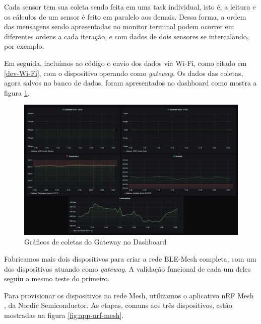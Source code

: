 \documentclass[../monografia.tex]{subfiles}
\begin{document}
Cada sensor tem sua coleta sendo feita em uma task individual, isto é, a leitura e os cálculos de um sensor é feito em paralelo aos demais. Dessa forma, a ordem das mensagens sendo apresentadas no monitor terminal podem ocorrer em diferentes ordens a cada iteração, e com dados de dois sensores se intercalando, por exemplo. \newpage

Em seguida, incluímos ao código o envio dos dados via Wi-Fi, como citado em \ref{dev-Wi-Fi}, com o dispositivo operando como \textit{gateway}. Os dados das coletas, agora salvos no banco de dados, foram apresentados no dashboard como mostra a figura \ref{fig:dashboard-graphs}.

\begin{figure}[h]
	\centering
	\includegraphics[width=\textwidth]{dashboard-graphs}
	\caption{Gráficos de coletas do Gateway no Dashboard}
	\label{fig:dashboard-graphs}
\end{figure}

Fabricamos mais dois dispositivos para criar a rede BLE-Mesh completa, com um dos dispositivos atuando como \textit{gateway}. A validação funcional de cada um deles seguiu o mesmo teste do primeiro.  

Para provisionar os dispositivos na rede Mesh, utilizamos o aplicativo nRF Mesh \cite{nrf-app}, da Nordic Semiconductor. As etapas, comuns aos três dispositivos, estão mostradas na figura \ref{fig:app-nrf-mesh}.
\end{document}
